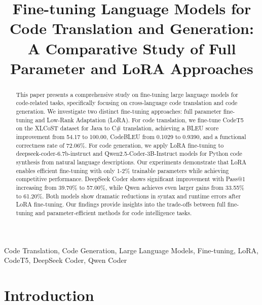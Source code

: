 \documentclass[conference]{IEEEtran}
\begin{document}
\title{Fine-tuning Language Models for Code Translation and Generation: A Comparative Study of Full Parameter and LoRA Approaches}

\author{
\and
{}
}

\maketitle

\begin{abstract}
This paper presents a comprehensive study on fine-tuning large language models for code-related tasks, specifically focusing on cross-language code translation and code generation. We investigate two distinct fine-tuning approaches: full parameter fine-tuning and Low-Rank Adaptation (LoRA). For code translation, we fine-tune CodeT5 on the XLCoST dataset for Java to C\# translation, achieving a BLEU score improvement from 54.17 to 100.00, CodeBLEU from 0.1029 to 0.9390, and a functional correctness rate of 72.06\%. For code generation, we apply LoRA fine-tuning to deepseek-coder-6.7b-instruct and Qwen2.5-Coder-3B-Instruct models for Python code synthesis from natural language descriptions. Our experiments demonstrate that LoRA enables efficient fine-tuning with only 1-2\% trainable parameters while achieving competitive performance. DeepSeek Coder shows significant improvement with Pass@1 increasing from 39.70\% to 57.00\%, while Qwen achieves even larger gains from 33.55\% to 61.20\%. Both models show dramatic reductions in syntax and runtime errors after LoRA fine-tuning. Our findings provide insights into the trade-offs between full fine-tuning and parameter-efficient methods for code intelligence tasks.
\end{abstract}

\begin{IEEEkeywords}
Code Translation, Code Generation, Large Language Models, Fine-tuning, LoRA, CodeT5, DeepSeek Coder, Qwen Coder
\end{IEEEkeywords}

\section{Introduction}
\end{document}
